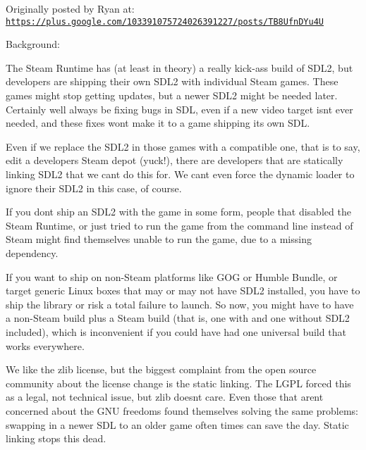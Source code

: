Originally posted by Ryan at\+: \href{https://plus.google.com/103391075724026391227/posts/TB8UfnDYu4U}{\tt https\+://plus.\+google.\+com/103391075724026391227/posts/\+T\+B8\+Ufn\+D\+Yu4U}

Background\+:


\begin{DoxyItemize}
\item The Steam Runtime has (at least in theory) a really kick-\/ass build of S\+D\+L2, but developers are shipping their own S\+D\+L2 with individual Steam games. These games might stop getting updates, but a newer S\+D\+L2 might be needed later. Certainly we\textquotesingle{}ll always be fixing bugs in S\+DL, even if a new video target isn\textquotesingle{}t ever needed, and these fixes won\textquotesingle{}t make it to a game shipping its own S\+DL.
\item Even if we replace the S\+D\+L2 in those games with a compatible one, that is to say, edit a developer\textquotesingle{}s Steam depot (yuck!), there are developers that are statically linking S\+D\+L2 that we can\textquotesingle{}t do this for. We can\textquotesingle{}t even force the dynamic loader to ignore their S\+D\+L2 in this case, of course.
\item If you don\textquotesingle{}t ship an S\+D\+L2 with the game in some form, people that disabled the Steam Runtime, or just tried to run the game from the command line instead of Steam might find themselves unable to run the game, due to a missing dependency.
\item If you want to ship on non-\/\+Steam platforms like G\+OG or Humble Bundle, or target generic Linux boxes that may or may not have S\+D\+L2 installed, you have to ship the library or risk a total failure to launch. So now, you might have to have a non-\/\+Steam build plus a Steam build (that is, one with and one without S\+D\+L2 included), which is inconvenient if you could have had one universal build that works everywhere.
\item We like the zlib license, but the biggest complaint from the open source community about the license change is the static linking. The L\+G\+PL forced this as a legal, not technical issue, but zlib doesn\textquotesingle{}t care. Even those that aren\textquotesingle{}t concerned about the G\+NU freedoms found themselves solving the same problems\+: swapping in a newer S\+DL to an older game often times can save the day. Static linking stops this dead.
\end{DoxyItemize}

